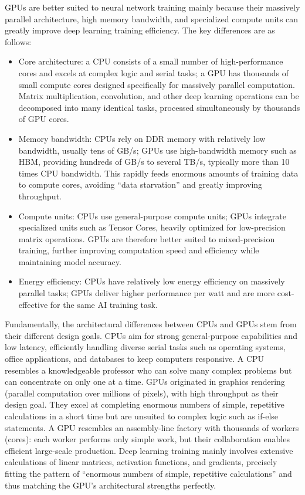 GPUs are better suited to neural network training mainly because their massively parallel architecture, high memory bandwidth, and specialized compute units can greatly improve deep learning training efficiency. The key differences are as follows:

\begin{itemize}
\tightlist
\item
  Core architecture: a CPU consists of a small number of high-performance cores and excels at complex logic and serial tasks; a GPU has thousands of small compute cores designed specifically for massively parallel computation. Matrix multiplication, convolution, and other deep learning operations can be decomposed into many identical tasks, processed simultaneously by thousands of GPU cores.
\item
  Memory bandwidth: CPUs rely on DDR memory with relatively low bandwidth, usually tens of GB/s; GPUs use high-bandwidth memory such as HBM, providing hundreds of GB/s to several TB/s, typically more than 10 times CPU bandwidth. This rapidly feeds enormous amounts of training data to compute cores, avoiding ``data starvation'' and greatly improving throughput.
\item
  Compute units: CPUs use general-purpose compute units; GPUs integrate specialized units such as Tensor Cores, heavily optimized for low-precision matrix operations. GPUs are therefore better suited to mixed-precision training, further improving computation speed and efficiency while maintaining model accuracy.
\item
  Energy efficiency: CPUs have relatively low energy efficiency on massively parallel tasks; GPUs deliver higher performance per watt and are more cost-effective for the same AI training task.
\end{itemize}

Fundamentally, the architectural differences between CPUs and GPUs stem from their different design goals. CPUs aim for strong general-purpose capabilities and low latency, efficiently handling diverse serial tasks such as operating systems, office applications, and databases to keep computers responsive. A CPU resembles a knowledgeable professor who can solve many complex problems but can concentrate on only one at a time. GPUs originated in graphics rendering (parallel computation over millions of pixels), with high throughput as their design goal. They excel at completing enormous numbers of simple, repetitive calculations in a short time but are unsuited to complex logic such as if-else statements. A GPU resembles an assembly-line factory with thousands of workers (cores): each worker performs only simple work, but their collaboration enables efficient large-scale production. Deep learning training mainly involves extensive calculations of linear matrices, activation functions, and gradients, precisely fitting the pattern of ``enormous numbers of simple, repetitive calculations'' and thus matching the GPU's architectural strengths perfectly.

